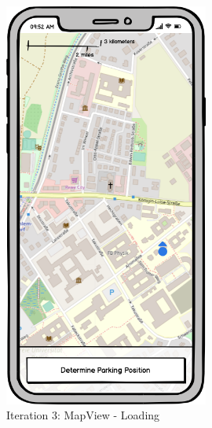 \begin{figure}[H]
  \centering
  \begin{minipage}[b]{0.45\textwidth}
    \centering
    \includegraphics[width=0.6\textwidth]{images/UI/Iteration3-MapView-Loading.png}
    \caption{Iteration 3: MapView - Loading}
    \label{fig:i3-mv-loading}
  \end{minipage}
  \hfill
  \begin{minipage}[b]{0.45\textwidth}
    \centering

\end{minipage}
\end{figure}
